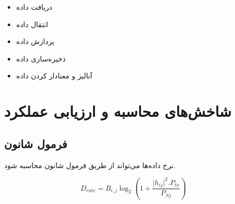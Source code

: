 \documentclass[a4paper]{article}
\begin{document}
\begin{itemize}
    \item دریافت داده
    \item انتقال داده
    \item پردازش داده
    \item ذخیره‌سازی داده
    \item آنالیز و معنادار کردن داده
\end{itemize}

\section{شاخش‌های محاسبه و ارزیابی عملکرد}

\begin{table}[H]
    \centering
    \caption{تعریف ثابت‌های مورد استفاده در فرمول‌ها}
    \label{table:staticAndDynamicComparison}
\end{table}

\subsection{فرمول شانون}

نرخ داده‌ها می‌تواند از طریق فرمول شانون محاسبه شود.

\begin{equation}
    D_{rate} = B_{i,j} \log_{2} (1 + \frac{\lvert h_{ij} \rvert ^{2} . P_{tx}}{P_{Nj}}) 
\end{equation}
\end{document}
